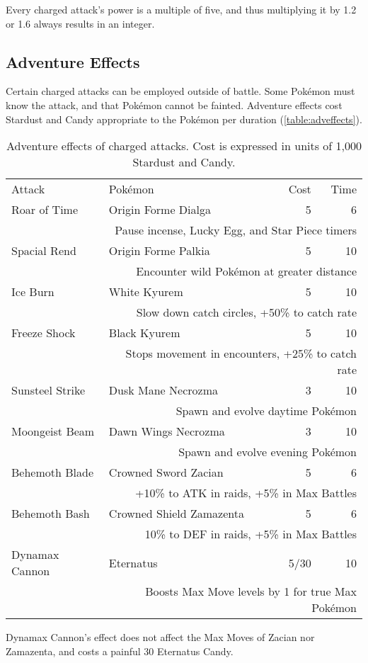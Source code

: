 \begin{tipbox}[title=Did you notice?]
Every charged attack's power is a multiple of five, and thus multiplying it by 1.2 or 1.6 always results in an integer.
\end{tipbox}

\subsection{Adventure Effects\label{sec:effects}}
Certain charged attacks can be employed outside of battle.
Some Pokémon must know the attack, and that Pokémon cannot be fainted.
Adventure effects cost Stardust and Candy appropriate to the Pokémon
  per duration (\autoref{table:adveffects}).
\begin{table}
\centering
\begin{tabular}{llrr}
Attack & Pokémon & Cost & Time\\
\Midrule
Roar of Time & Origin Forme Dialga & 5 & 6\\
  & \multicolumn{3}{r}{\footnotesize{}Pause incense, Lucky Egg, and Star Piece timers}\\
Spacial Rend & Origin Forme Palkia & 5 & 10\\
  & \multicolumn{3}{r}{\footnotesize{}Encounter wild Pokémon at greater distance}\\
Ice Burn & White Kyurem & 5 & 10\\
  & \multicolumn{3}{r}{\footnotesize{}Slow down catch circles, +50\% to catch rate}\\
Freeze Shock & Black Kyurem & 5 & 10\\
  & \multicolumn{3}{r}{\footnotesize{}Stops movement in encounters, +25\% to catch rate}\\
Sunsteel Strike & Dusk Mane Necrozma & 3 & 10\\
  & \multicolumn{3}{r}{\footnotesize{}Spawn and evolve daytime Pokémon}\\
Moongeist Beam & Dawn Wings Necrozma & 3 & 10\\
  & \multicolumn{3}{r}{\footnotesize{}Spawn and evolve evening Pokémon}\\
Behemoth Blade & Crowned Sword Zacian & 5 & 6\\
  & \multicolumn{3}{r}{\footnotesize{}+10\% to ATK in raids, +5\% in Max Battles}\\
Behemoth Bash & Crowned Shield Zamazenta & 5 & 6\\
  & \multicolumn{3}{r}{\footnotesize{}10\% to DEF in raids, +5\% in Max Battles}\\
Dynamax Cannon & Eternatus & 5/30 & 10\\
  & \multicolumn{3}{r}{\footnotesize{}Boosts Max Move levels by 1 for true Max Pokémon}\\
\end{tabular}
\caption[Adventure effects of charged attacks]{Adventure effects of charged attacks. Cost is expressed in units of 1,000 Stardust and Candy.\label{table:adveffects}}
\end{table}
Dynamax Cannon's effect does not affect the Max Moves of Zacian nor Zamazenta,
 and costs a painful 30 Eternatus Candy.


